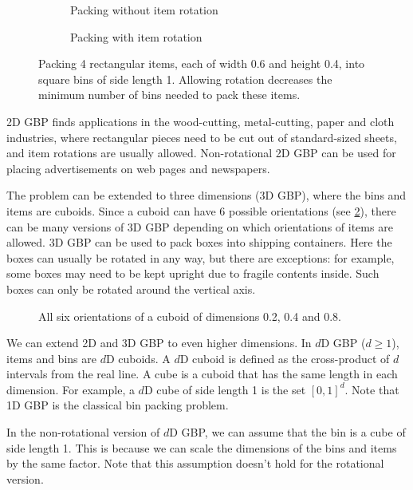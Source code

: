 \begin{figure}[htb]
\centering
\begin{subfigure}{0.5\textwidth}
    \centering
    
    \caption{Packing without item rotation}
\end{subfigure}
\begin{subfigure}{0.4\textwidth}
    \centering
    
    \caption{Packing with item rotation}
\end{subfigure}
\caption[Packing 4 rectangles into square bins. Allowing rotation decreases $\opt(I)$.]%
{Packing 4 rectangular items, each of width 0.6 and height 0.4,
into square bins of side length 1.
Allowing rotation decreases the minimum number of bins needed to pack these items.}
\label{fig:rot-vs-nonrot}
\end{figure}

2D GBP finds applications in the wood-cutting, metal-cutting, paper and cloth industries,
where rectangular pieces need to be cut out of standard-sized sheets,
and item rotations are usually allowed.
Non-rotational 2D GBP can be used for placing advertisements on web pages and newspapers.

The problem can be extended to three dimensions (3D GBP),
where the bins and items are cuboids.
Since a cuboid can have 6 possible orientations (see \cref{fig:3d-orients}), there can be
many versions of 3D GBP depending on which orientations of items are allowed.
3D GBP can be used to pack boxes into shipping containers.
Here the boxes can usually be rotated in any way, but there are exceptions:
for example, some boxes may need to be kept upright due to fragile contents inside.
Such boxes can only be rotated around the vertical axis.

\begin{figure}[htb]
\centering

\caption{All six orientations of a cuboid of dimensions 0.2, 0.4 and 0.8.}
\label{fig:3d-orients}
\end{figure}

We can extend 2D and 3D GBP to even higher dimensions.
In $d$D GBP ($d \ge 1$), items and bins are $d$D cuboids.
A $d$D cuboid is defined as the cross-product of $d$ intervals from the real line.
A cube is a cuboid that has the same length in each dimension.
For example, a $d$D cube of side length 1 is the set $[0, 1]^d$.
Note that 1D GBP is the classical bin packing problem.

In the non-rotational version of $d$D GBP, we can assume \wLoG{} that
the bin is a cube of side length 1.
This is because we can scale the dimensions of the bins and items by the same factor.
Note that this assumption doesn't hold for the rotational version.

